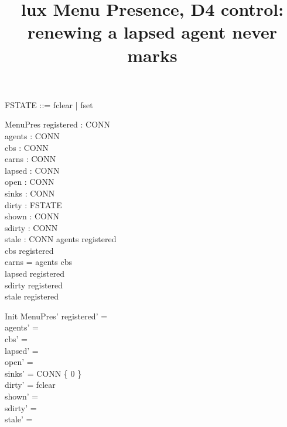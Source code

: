 \documentclass[a4paper,10pt,fleqn]{article}
\begin{document}
\title{lux Menu Presence, D4 control: renewing a lapsed agent never marks}
\maketitle

\begin{zed}
  [CONN]
\end{zed}

\begin{zed}
  FSTATE ::= fclear | fset
\end{zed}

\begin{schema}{MenuPres}
  registered : \power CONN \\
  agents : \power CONN \\
  cbs : \power CONN \\
  earns : \power CONN \\
  lapsed : \power CONN \\
  open : \power CONN \\
  sinks : CONN   \\
  dirty : FSTATE \\
  shown : \power CONN \\
  sdirty : \power CONN \\
  stale : \power CONN
\where
  agents \subseteq registered \\
  cbs \subseteq registered \\
  earns = agents \cup cbs \\
  lapsed \subseteq registered \\
  sdirty \subseteq registered \\
  stale \subseteq registered
\end{schema}

\begin{schema}{Init}
  MenuPres'
\where
  registered' = \emptyset \\
  agents' = \emptyset \\
  cbs' = \emptyset \\
  lapsed' = \emptyset \\
  open' = \emptyset \\
  sinks' = CONN \cross \{ 0 \} \\
  dirty' = fclear \\
  shown' = \emptyset \\
  sdirty' = \emptyset \\
  stale' = \emptyset
\end{schema}
\end{document}
